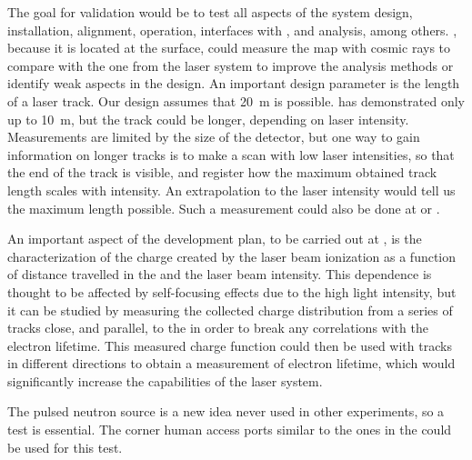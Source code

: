 The goal for validation would be to test all aspects of the system design, installation, alignment, operation, interfaces with , and analysis, among others. , because it is located at the surface, could measure the \efield map with cosmic rays to compare with the one from the laser system to improve the analysis methods or identify weak aspects in the design. An important design parameter is the length of a laser track. Our design assumes that \SI{20}{\m} is possible.  has demonstrated only up to \SI{10}{\m}, but the track could be longer, depending on laser intensity. Measurements are limited by the size of the detector, but one way to gain information on longer tracks is %
to make a scan with low laser intensities, so that the end of the track is  visible, and register how the maximum obtained track length scales with intensity. An extrapolation to the   laser intensity would tell us the maximum length possible. Such a measurement could also be done at  or .

An important aspect of the development plan, to be carried out at , is the characterization of the charge created by the laser beam ionization as a function of distance travelled in the  and the laser beam intensity. This dependence is thought to be affected by self-focusing effects due to the high light intensity, but it can be studied by measuring the collected charge distribution from a series of tracks close, and parallel, to the  in order to break any correlations with the electron lifetime. This measured charge function could then be used with tracks in different directions to obtain a measurement of electron lifetime, which would significantly increase the capabilities of the laser system.  

The pulsed neutron source is a new idea never used in other experiments, so a  test is essential. The corner human access ports similar to the ones in the   could be used for this test.

